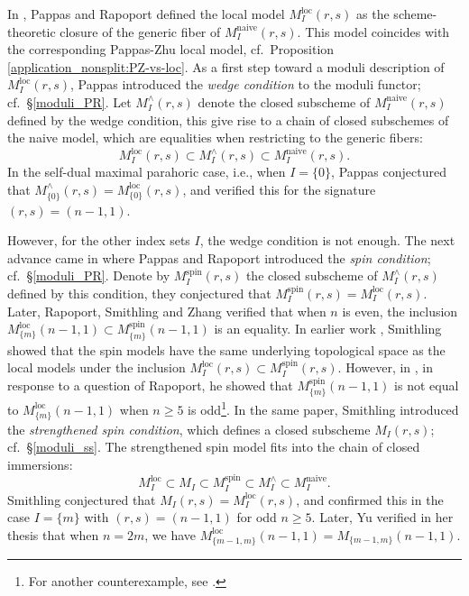 \documentclass[pdflatex,sn-mathphys-num]{sn-jnl}%
\theoremstyle{thmstyleone}%
\theoremstyle{thmstyletwo}%
\numberwithin{equation}{subsection}
\theoremstyle{thmstylethree}%
\newcommand{\loc}{\ensuremath{\mathrm{loc}}\xspace}
\newcommand{\naive}{\ensuremath{\mathrm{naive}}\xspace}
\newcommand{\spin}{\ensuremath{\mathrm{spin}}\xspace}
\begin{document}
In \cite[\S 11]{PR2008}, Pappas and Rapoport defined the local model $M_I^{\loc}(r,s)$ as the scheme-theoretic closure of the generic fiber of $M_I^\naive(r,s)$. This model coincides with the corresponding Pappas-Zhu local model, cf.\ Proposition \ref{application_nonsplit:PZ-vs-loc}.
As a first step toward a moduli description of $M_I^{\loc}(r,s)$, Pappas \cite{Pappas2000} introduced the \emph{wedge condition} to the moduli functor; cf.\ \S \ref{moduli_PR}.
Let $M_I^\wedge(r,s)$ denote the closed subscheme of $M_I^\naive(r,s)$ defined by the wedge condition, this give rise to a chain of closed subschemes of the naive model, which are equalities when restricting to the generic fibers:
\begin{equation*}
	M_I^\loc(r,s)\subset M_I^\wedge(r,s)\subset M^\naive_I(r,s).
\end{equation*}
In the self-dual maximal parahoric case, i.e., when $I=\{0\}$, Pappas conjectured that $M^\wedge_{\{0\}}(r,s)=M^\loc_{\{0\}}(r,s)$, and verified this for the signature $(r,s)=(n-1,1)$.
		
However, for the other index sets $I$, the wedge condition is not enough. The next advance came in \cite{PR2009} where Pappas and Rapoport introduced the \emph{spin condition}; cf.\ \S \ref{moduli_PR}.
Denote by $M_I^{\spin}(r,s)$ the closed subscheme of $M_I^\wedge(r,s)$ defined by this condition, they conjectured that $M_I^{\spin}(r,s)=M_I^{\loc}(r,s)$.
Later, Rapoport, Smithling and Zhang \cite{RSZ2017} verified that when $n$ is even, the inclusion $M_{\{m\}}^\loc(n-1,1)\subset M_{\{m\}}^\spin(n-1,1)$ is an equality.
In earlier work \cite{Smithling2011, Smithling2014}, Smithling showed that the spin models have the same underlying topological space as the local models under the inclusion $M^\loc_I(r,s)\subset M^\spin_I(r,s)$.
However, in \cite{Smithling2015}, in response to a question of Rapoport, he showed that $M^{\spin}_{\{m\}}(n-1,1)$ is not equal to $M^\loc_{\{m\}}(n-1,1)$ when $n\geq 5$ is odd\footnote{For another counterexample, see \cite[Remark 9.14]{RSZ2018}.}.
In the same paper, Smithling introduced the \emph{strengthened spin condition}, which defines a closed subscheme $M_I(r,s)$; cf.\ \S \ref{moduli_ss}. The strengthened spin model fits into the chain of closed immersions:
\begin{equation*}
	M_I^\loc\subset M_I\subset M_I^\spin\subset M_I^\wedge\subset M_I^\naive.
\end{equation*}
Smithling conjectured that $M_I(r,s)=M_I^{\loc}(r,s)$, and confirmed this in the case $I=\{m\}$ with $(r,s)=(n-1,1)$ for odd $n\geq 5$.
Later, Yu verified in her thesis \cite{Yu2019} that when $n=2m$, we have $M_{\{m-1,m\}}^\loc(n-1,1)=M_{\{m-1,m\}}(n-1,1)$.
		
\end{document}
